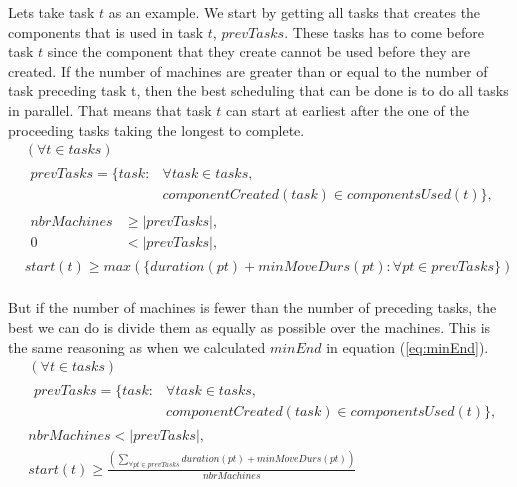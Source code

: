     Lets take task $t$ as an example. We start by getting all tasks that creates the components that is used in task $t$, $prevTasks$. These tasks has to come before task $t$ since the component that they create cannot be used before they are created. If the number of machines are greater than or equal to the number of task preceding task t, then the best scheduling that can be done is to do all tasks in parallel. That means that task $t$ can start at earliest after the one of the proceeding tasks taking the longest to complete.
  \begin{equation}
  \begin{aligned}\label{eq:70}
  &(\forall t \in tasks)\\
  &\begin{aligned}
  prevTasks = \{task : &\forall task \in tasks,\\
  &componentCreated(task) \in componentsUsed(t)\},
  \end{aligned}\\
  &\begin{aligned}
  nbrMachines &\ge |prevTasks|,\\
  0 &< |prevTasks|,
  \end{aligned}\\
  &start(t) \ge max(\{duration(pt) + minMoveDurs(pt) : \forall pt \in prevTasks\}) \\
  \end{aligned}
  \end{equation}

   \noindent But if the number of machines is fewer than the number of preceding tasks, the best we can do is divide them as equally as possible over the machines. This is the same reasoning as when we calculated $minEnd$ in equation (\ref{eq:minEnd}).
  \begin{equation}
  \begin{aligned}\label{eq:71}
  &(\forall t \in tasks) \\
  &\begin{aligned}
  prevTasks = \{task : &\forall task \in tasks,\\
  &componentCreated(task) \in componentsUsed(t)\},
  \end{aligned} \\
  &nbrMachines < |prevTasks|,  \\
  &start(t) \ge \frac{\left(\sum_{\forall pt \in prevTasks}duration(pt) + minMoveDurs(pt)\right)}{nbrMachines}
  \end{aligned}
  \end{equation}

